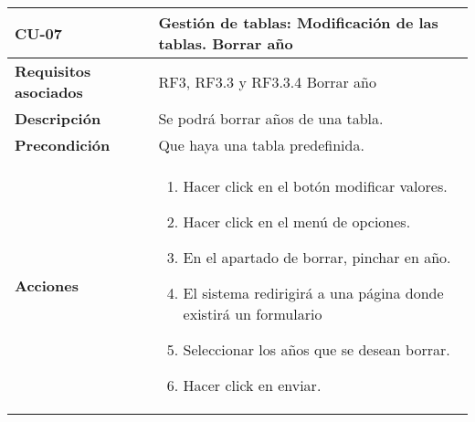 \newpage
\begin{longtable}[H]{@{}ll@{}}
\toprule
\begin{minipage}[b]{0.23\columnwidth}\raggedright\strut
\textbf{CU-07}\strut
\end{minipage} & \begin{minipage}[b]{0.71\columnwidth}\raggedright\strut
\textbf{Gestión de tablas: Modificación de las tablas. Borrar año}\strut
\end{minipage}\tabularnewline
\midrule
\endhead
\begin{minipage}[t]{0.23\columnwidth}\raggedright\strut
\textbf{Requisitos asociados}\strut
\end{minipage} & \begin{minipage}[t]{0.71\columnwidth}\raggedright\strut
RF3, RF3.3 y RF3.3.4 Borrar año\strut
\end{minipage}\tabularnewline
\begin{minipage}[t]{0.23\columnwidth}\raggedright\strut
\textbf{Descripción}\strut
\end{minipage} & \begin{minipage}[t]{0.71\columnwidth}\raggedright\strut
Se podrá borrar años de una tabla.
\strut
\end{minipage}\tabularnewline
\begin{minipage}[t]{0.23\columnwidth}\raggedright\strut
\textbf{Precondición}\strut
\end{minipage} & \begin{minipage}[t]{0.71\columnwidth}\raggedright\strut
Que haya una tabla predefinida.\strut
\end{minipage}\tabularnewline
\begin{minipage}[t]{0.23\columnwidth}\raggedright\strut
\textbf{Acciones}\strut
\end{minipage} & \begin{minipage}[t]{0.71\columnwidth}\raggedright\strut
\begin{enumerate}
\def\labelenumi{\arabic{enumi}.}
\tightlist
\item
Hacer click en el botón modificar valores.
\item
Hacer click en el menú de opciones.
\item
En el apartado de borrar, pinchar en año.
\item
El sistema redirigirá a una página donde existirá un formulario
\item 
Seleccionar los años que se desean borrar.
\item
Hacer click en enviar.
\end{enumerate}\strut

\end{minipage}
\end{longtable}
